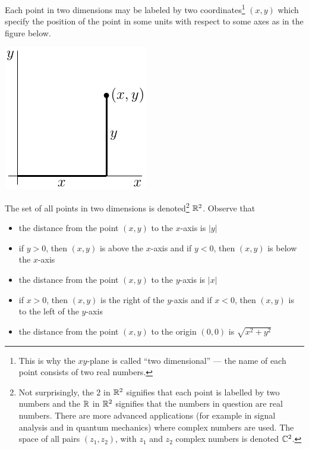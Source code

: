 Each point in two dimensions may be labeled by two coordinates\footnote{This is why the $xy$-plane is called ``two dimensional'' --- the name of each point consists of two real numbers.}
$(x,y)$ which specify the position of the point in some units with respect
to some axes as in the figure below. 
\begin{efig}
\begin{center}
   \includegraphics{point2d.pdf}
\end{center}
\end{efig}
The set of all points in two dimensions is denoted\footnote{Not surprisingly,
the $2$ in $\mathbb{R}^2$ signifies that each point is labelled by two numbers
and the $\mathbb{R}$ in $\mathbb{R}^2$ signifies that the numbers in question are
real numbers. There are more advanced applications (for example in
signal analysis and in quantum mechanics) where complex numbers are used.
The space of all pairs $(z_1,z_2)$, with $z_1$ and $z_2$ complex numbers 
is denoted  $\mathbb{C}^2$.} $\mathbb{R}^2$.
Observe that 
\begin{itemize}\itemsep1pt \parskip0pt 
\item the distance from the point $(x,y)$ to the $x$-axis is $|y|$
\item if $y>0$, then $(x,y)$ is above the $x$-axis and if $y<0$, then
        $(x,y)$ is below the $x$-axis
\item the distance from the point $(x,y)$ to the $y$-axis is $|x|$
\item if $x>0$, then $(x,y)$ is the right of the $y$-axis and if $x<0$, then
        $(x,y)$ is to the left of the $y$-axis
\item the distance from the point $(x,y)$ to the origin $(0,0)$ is 
     $\sqrt{x^2+y^2}$
\end{itemize}

